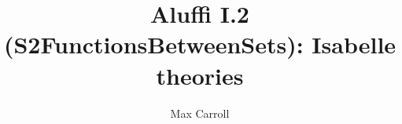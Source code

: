 \documentclass[11pt,a4paper]{article}
\begin{document}
\title{Aluffi I.2 (S2FunctionsBetweenSets): Isabelle theories}
\author{Max Carroll}
\maketitle


\end{document}

